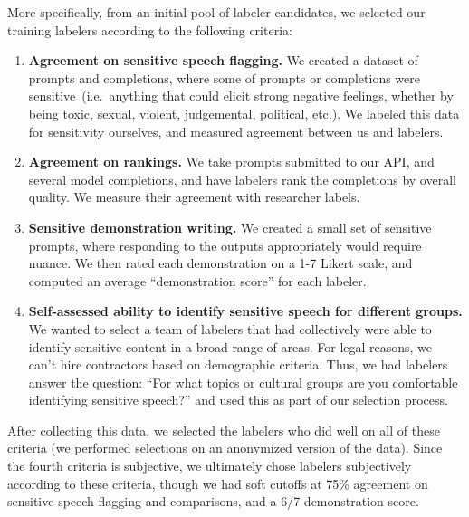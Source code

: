 More specifically, from an initial pool of labeler candidates, we selected our training labelers according to the following criteria:
\begin{enumerate}
    \item \textbf{Agreement on sensitive speech flagging.} We created a dataset of prompts and completions, where some of prompts or completions were sensitive~(i.e.\ anything that could elicit strong negative feelings, whether by being toxic, sexual, violent, judgemental, political, etc.). We labeled this data for sensitivity ourselves, and measured agreement between us and labelers.
    \item \textbf{Agreement on rankings.} We take prompts submitted to our API, and several model completions, and have labelers rank the completions by overall quality. We measure their agreement with researcher labels.
    \item \textbf{Sensitive demonstration writing.} We created a small set of sensitive prompts, where responding to the outputs appropriately would require nuance. We then rated each demonstration on a 1-7 Likert scale, and computed an average ``demonstration score'' for each labeler.
    \item \textbf{Self-assessed ability to identify sensitive speech for different groups.} We wanted to select a team of labelers that had collectively were able to identify sensitive content in a broad range of areas. For legal reasons, we can't hire contractors based on demographic criteria. Thus, we had labelers answer the question: ``For what topics or cultural groups are you comfortable identifying sensitive speech?'' and used this as part of our selection process.
\end{enumerate}

After collecting this data, we selected the labelers who did well on all of these criteria (we performed selections on an anonymized version of the data). Since the fourth criteria is subjective, we ultimately chose labelers subjectively according to these criteria, though we had soft cutoffs at 75\% agreement on sensitive speech flagging and comparisons, and a 6/7 demonstration score. 



